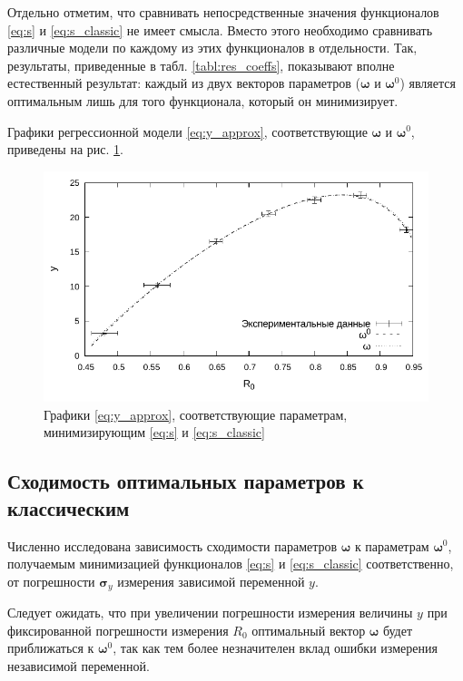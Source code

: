 \documentclass[tikz,10pt,a4paper]{article}
\newcommand{\bomega}{\boldsymbol{\omega}}
\begin{document}
Отдельно отметим, что сравнивать непосредственные значения функционалов \eqref{eq:s} и
\eqref{eq:s_classic} не имеет смысла. Вместо этого необходимо сравнивать различные
модели по каждому из этих функционалов в отдельности. Так, результаты, приведенные
в табл. \ref{tabl:res_coeffs}, показывают вполне естественный результат: каждый
из двух векторов параметров ($\bomega$ и $\bomega^0$) является оптимальным лишь
для того функционала, который он минимизирует.

Графики регрессионной модели \eqref{eq:y_approx}, соответствующие $\bomega$ и $\bomega^0$, приведены
на рис. \ref{fig:results}.

\begin{figure}[h]
  \centering
  \includegraphics[width=\textwidth]{figs/levmar/results_bw.pdf}
  \caption{Графики \eqref{eq:y_approx}, соответствующие параметрам,
	минимизирующим \eqref{eq:s} и \eqref{eq:s_classic}}
  \label{fig:results}
\end{figure}

\subsection{Сходимость оптимальных параметров к классическим}
Численно исследована зависимость сходимости параметров $\bomega$ к параметрам $\bomega^0$,
получаемым минимизацией функционалов \eqref{eq:s} и \eqref{eq:s_classic} соответственно, от
погрешности $\mathbf{\sigma}_y$ измерения зависимой переменной $y$.

Следует ожидать, что при увеличении погрешности измерения величины $y$ при
фиксированной погрешности измерения $R_0$ оптимальный вектор $\bomega$
будет приближаться к $\bomega^0$, так как тем более незначителен
вклад ошибки измерения независимой переменной.
\end{document}
